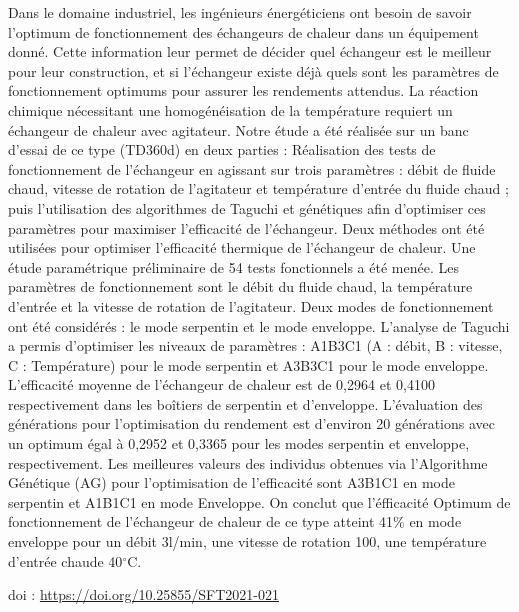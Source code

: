 {\normalsize
Dans le domaine industriel, les ingénieurs énergéticiens ont besoin de savoir l'optimum de fonctionnement des échangeurs de chaleur dans un équipement donné. Cette information leur permet de décider quel échangeur est le meilleur pour leur construction, et si l'échangeur existe déjà quels sont les paramètres de fonctionnement optimums pour assurer les rendements attendus. La réaction chimique nécessitant une homogénéisation de la température requiert un échangeur de chaleur avec agitateur. Notre étude a été réalisée sur un banc d'essai de ce type (TD360d) en deux parties : Réalisation des tests de fonctionnement de l'échangeur en agissant sur trois paramètres : débit de fluide chaud, vitesse de rotation de l'agitateur et température d'entrée du fluide chaud ; puis l'utilisation des algorithmes de Taguchi et génétiques afin d'optimiser ces paramètres pour maximiser l'efficacité de l'échangeur. Deux méthodes ont été utilisées pour optimiser l'efficacité thermique de l'échangeur de chaleur. Une étude paramétrique préliminaire de 54 tests fonctionnels a été menée. Les paramètres de fonctionnement sont le débit du fluide chaud, la température d'entrée et la vitesse de rotation de l'agitateur. Deux modes de fonctionnement ont été considérés : le mode serpentin et le mode enveloppe. L'analyse de Taguchi a permis d'optimiser les niveaux de paramètres : A1B3C1 (A : débit, B : vitesse, C : Température) pour le mode serpentin et A3B3C1 pour le mode enveloppe. L'efficacité moyenne de l'échangeur de chaleur est de 0,2964 et 0,4100 respectivement dans les boîtiers de serpentin et d'enveloppe. L'évaluation des générations pour l'optimisation du rendement est d'environ 20 générations avec un optimum égal à 0,2952 et 0,3365 pour les modes serpentin et enveloppe, respectivement. Les meilleures valeurs des individus obtenues via l'Algorithme Génétique (AG) pour l'optimisation de l'efficacité sont A3B1C1 en mode serpentin et A1B1C1 en mode Enveloppe. On conclut que l'éfficacité Optimum de fonctionnement de l'échangeur de chaleur de ce type atteint  41\% en mode enveloppe pour un débit 3l/min, une vitesse de rotation 100, une température d'entrée chaude 40$^{\circ}$C.

 \vfill doi : \url{https://doi.org/10.25855/SFT2021-021}

}
 
